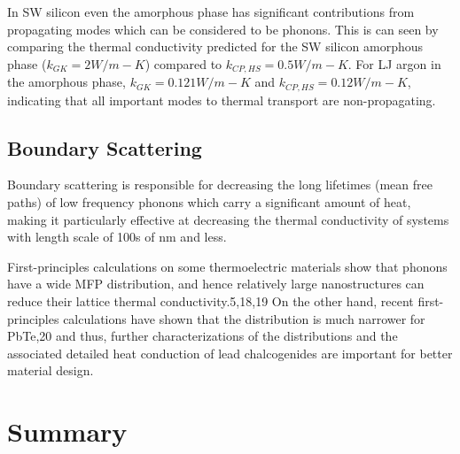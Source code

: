 \documentclass[aps,prb,twocolumn,superscriptaddress,preprintnumbers,amsmath,amssymb,floatfix]{revtex4}
\begin{document}
In SW silicon even the amorphous phase has significant contributions 
from propagating modes which can be considered to be phonons. This is 
can seen by comparing the thermal conductivity predicted for the 
SW silicon amorphous phase ($k_{GK} = 2 W/m-K$) compared to 
$k_{CP,HS} = 0.5 W/m-K$.  For LJ argon in the amorphous phase, 
$k_{GK} = 0.121 W/m-K$ and $k_{CP,HS} = 0.12 W/m-K$, indicating that 
all important modes to thermal transport are non-propagating.

\subsection{\label{S:}Boundary Scattering}
Boundary scattering is responsible for decreasing the long lifetimes 
(mean free paths) of low frequency phonons which carry a significant 
amount of heat, making it particularly effective at decreasing the 
thermal conductivity of systems with length scale of 100s of nm and 
less.\cite{mcgaughey_nanostructure_2012}

First-principles calculations on some thermoelectric
materials show that phonons have a wide MFP distribution,
and hence relatively large nanostructures can reduce their
lattice thermal conductivity.5,18,19 On the other hand, recent
first-principles calculations have shown that the distribution is
much narrower for PbTe,20 and thus, further characterizations
of the distributions and the associated detailed heat conduction
of lead chalcogenides are important for better material design.
\section{\label{S:}Summary}


\appendix
\end{document}
